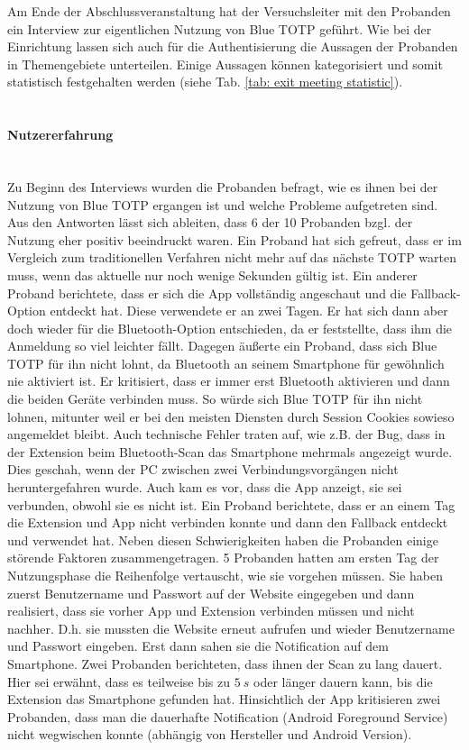 Am Ende der Abschlussveranstaltung hat der Versuchsleiter mit den Probanden ein 
Interview zur eigentlichen Nutzung von Blue TOTP geführt. Wie bei der Einrichtung 
lassen sich auch für die Authentisierung die Aussagen der Probanden in 
Themengebiete unterteilen. Einige Aussagen können kategorisiert und somit 
statistisch festgehalten werden (siehe Tab. \ref{tab: exit meeting statistic}).
\\\\
\paragraph*{Nutzererfahrung}
\mbox{} \vspace{0.1cm} \\
Zu Beginn des Interviews wurden die Probanden befragt, wie es ihnen bei der Nutzung 
von Blue TOTP ergangen ist und welche Probleme aufgetreten sind. Aus den Antworten 
lässt sich ableiten, dass 6 der 10 Probanden bzgl. der Nutzung eher positiv 
beeindruckt waren. Ein Proband hat sich gefreut, dass er im Vergleich zum 
traditionellen Verfahren nicht mehr auf das nächste TOTP warten muss, wenn das 
aktuelle nur noch wenige Sekunden gültig ist. Ein anderer Proband berichtete, dass 
er sich die App vollständig angeschaut und die Fallback-Option entdeckt hat. Diese 
verwendete er an zwei Tagen. Er hat sich dann aber doch wieder für die 
Bluetooth-Option entschieden, da er feststellte, dass ihm die Anmeldung so viel 
leichter fällt. Dagegen äußerte ein Proband, dass sich Blue TOTP für ihn nicht 
lohnt, da Bluetooth an seinem Smartphone für gewöhnlich nie aktiviert ist. Er 
kritisiert, dass er immer erst Bluetooth aktivieren und dann die beiden Geräte 
verbinden muss. So würde sich Blue TOTP für ihn nicht lohnen, mitunter 
weil er bei den meisten Diensten durch Session Cookies sowieso angemeldet bleibt. 
Auch technische Fehler traten auf, wie z.B. der Bug, dass in der Extension beim 
Bluetooth-Scan das Smartphone mehrmals angezeigt wurde. Dies geschah, wenn der PC zwischen zwei Verbindungsvorgängen 
nicht heruntergefahren wurde. Auch kam es vor, dass die App anzeigt, sie sei 
verbunden, obwohl sie es nicht ist. Ein Proband berichtete, dass er an einem Tag 
die Extension und App nicht verbinden konnte und dann den Fallback entdeckt und 
verwendet hat. Neben diesen Schwierigkeiten haben die Probanden einige störende 
Faktoren zusammengetragen. 5 Probanden hatten am ersten Tag der Nutzungsphase die 
Reihenfolge vertauscht, wie sie vorgehen müssen. Sie haben zuerst Benutzername und 
Passwort auf der Website eingegeben und dann realisiert, dass sie vorher App und 
Extension verbinden müssen und nicht nachher. D.h. sie mussten die Website erneut 
aufrufen und wieder Benutzername und Passwort eingeben. Erst dann sahen sie die 
Notification auf dem Smartphone. Zwei Probanden berichteten, dass ihnen der Scan zu 
lang dauert. Hier sei erwähnt, dass es teilweise bis zu $5~s$ oder länger dauern kann, bis die Extension das Smartphone gefunden hat. Hinsichtlich der App 
kritisieren zwei Probanden, dass man die dauerhafte Notification (Android 
Foreground Service) nicht wegwischen konnte (abhängig von Hersteller und Android Version).
\\\\
